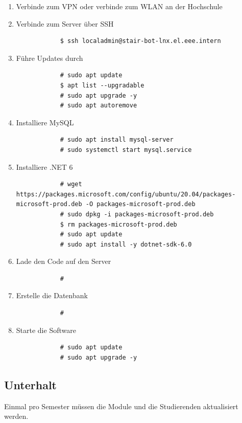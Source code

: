 \documentclass[a4paper, table]{article}
\begin{document}
\begin{enumerate}
    \item Verbinde zum VPN oder verbinde zum WLAN an der Hochschule
    \item Verbinde zum Server über SSH
        \begin{verbatim}
            $ ssh localadmin@stair-bot-lnx.el.eee.intern
        \end{verbatim}
    \item Führe Updates durch
        \begin{verbatim}
            # sudo apt update
            $ apt list --upgradable
            # sudo apt upgrade -y
            # sudo apt autoremove
        \end{verbatim}
    \item Installiere MySQL
        \begin{verbatim}
            # sudo apt install mysql-server
            # sudo systemctl start mysql.service
        \end{verbatim}
    \item Installiere .NET 6
        \begin{verbatim}
            # wget https://packages.microsoft.com/config/ubuntu/20.04/packages-microsoft-prod.deb -O packages-microsoft-prod.deb
            # sudo dpkg -i packages-microsoft-prod.deb
            $ rm packages-microsoft-prod.deb
            # sudo apt update
            # sudo apt install -y dotnet-sdk-6.0
        \end{verbatim}
    \item Lade den Code auf den Server
        \begin{verbatim}
            # 
        \end{verbatim}
    \item Erstelle die Datenbank
        \begin{verbatim}
            # 
        \end{verbatim}
    \item Starte die Software
        \begin{verbatim}
            # sudo apt update
            # sudo apt upgrade -y
        \end{verbatim}
\end{enumerate}

\subsection{Unterhalt}

Einmal pro Semester müssen die Module und die Studierenden aktualisiert werden.
\end{document}
